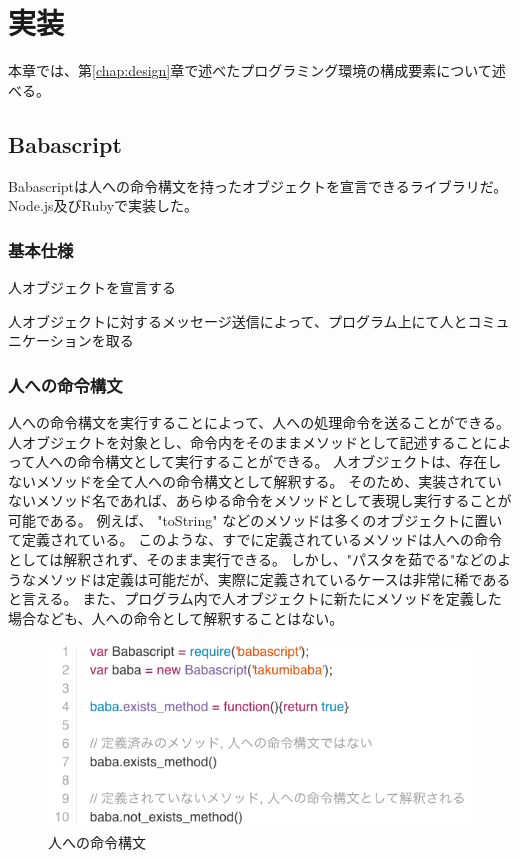 \chapter{実装}
\label{chap:implementation}

本章では、第\ref{chap:design}章で述べたプログラミング環境の構成要素について述べる。

\section{Babascript}\label{babascript}

Babascriptは人への命令構文を持ったオブジェクトを宣言できるライブラリだ。
Node.js及びRubyで実装した。

\subsection{基本仕様}\label{ux57faux672cux4ed5ux69d8}

人オブジェクトを宣言する

人オブジェクトに対するメッセージ送信によって、プログラム上にて人とコミュニケーションを取る

\subsection{人への命令構文}\label{ux4ebaux3078ux306eux547dux4ee4ux69cbux6587}

人への命令構文を実行することによって、人への処理命令を送ることができる。
人オブジェクトを対象とし、命令内をそのままメソッドとして記述することによって人への命令構文として実行することができる。
人オブジェクトは、存在しないメソッドを全て人への命令構文として解釈する。
そのため、実装されていないメソッド名であれば、あらゆる命令をメソッドとして表現し実行することが可能である。
例えば、 "toString"
などのメソッドは多くのオブジェクトに置いて定義されている。
このような、すでに定義されているメソッドは人への命令としては解釈されず、そのまま実行できる。
しかし、"パスタを茹でる"などのようなメソッドは定義は可能だが、実際に定義されているケースは非常に稀であると言える。
また、プログラム内で人オブジェクトに新たにメソッドを定義した場合なども、人への命令として解釈することはない。

\begin{figure}[htbp]
  \begin{center}
  \includegraphics[width=.8\linewidth,bb=0 0 577 253]{images/methodmissing_sample.js.png}
  \end{center}
  \caption{人への命令構文}
  \label{fig:methodmissing_sample}
\end{figure}

